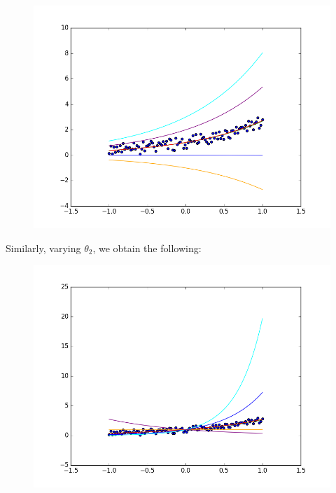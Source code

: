 \documentclass[10pt]{article}
\begin{document}
\begin{figure}[H]
\includegraphics[scale=0.4]{expNoiseVariationT1.png}
\end{figure}
Similarly, varying $\theta_{2}$, we obtain the following:
\begin{figure}[H]
\includegraphics[scale=0.4]{expNoiseVariationT2.png}
\end{figure}
\newpage
\end{document}
